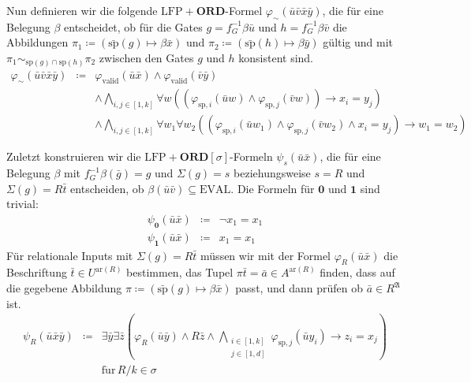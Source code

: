 Nun definieren wir die folgende $\mathrm{LFP}+\mathbf{ORD}$-Formel
$\varphi_{\sim}\left(\bar{u}\bar{v}\bar{x}\bar{y}\right)$, die für
eine Belegung $\beta$ entscheidet, ob für die Gates $g=f_{G}^{-1}\beta\bar{u}$
und $h=f_{G}^{-1}\beta\bar{v}$ die Abbildungen $\pi_{1}\coloneqq\left(\bar{\mathrm{sp}}\left(g\right)\mapsto\beta\bar{x}\right)$
und $\pi_{2}\coloneqq\left(\bar{\mathrm{sp}}\left(h\right)\mapsto\beta\bar{y}\right)$
gültig und mit $\pi_{1}\sim_{\mathrm{sp}\left(g\right)\cap\mathrm{sp}\left(h\right)}\pi_{2}$
zwischen den Gates $g$ und $h$ konsistent sind. 
\begin{eqnarray*}
\varphi_{\sim}\left(\bar{u}\bar{v}\bar{x}\bar{y}\right) & \coloneqq & \varphi_{\mathrm{valid}}\left(\bar{u}\bar{x}\right)\wedge\varphi_{\mathrm{valid}}\left(\bar{v}\bar{y}\right)\\
 &  & \wedge\bigwedge_{i,j\in\left[1,k\right]}\forall w\left(\left(\varphi_{\mathrm{sp},i}\left(\bar{u}w\right)\wedge\varphi_{\mathrm{sp},j}\left(\bar{v}w\right)\right)\rightarrow x_{i}=y_{j}\right)\\
 &  & \wedge\bigwedge_{i,j\in\left[1,k\right]}\forall w_{1}\forall w_{2}\left(\left(\varphi_{\mathrm{sp},i}\left(\bar{u}w_{1}\right)\wedge\varphi_{\mathrm{sp},j}\left(\bar{v}w_{2}\right)\wedge x_{i}=y_{j}\right)\rightarrow w_{1}=w_{2}\right)
\end{eqnarray*}

Zuletzt konstruieren wir die $\mathrm{LFP}+\mathbf{ORD}\left[\sigma\right]$-Formeln
$\psi_{s}\left(\bar{u}\bar{x}\right)$, die für eine Belegung $\beta$
mit $f_{G}^{-1}\beta\left(\bar{g}\right)=g$ und $\Sigma\left(g\right)=s$
beziehungsweise $s=R$ und $\Sigma\left(g\right)=R\bar{t}$ entscheiden,
ob $\beta\left(\bar{u}\bar{v}\right)\subseteq\mathrm{EVAL}$. Die
Formeln für $\mathbf{0}$ und $\mathbf{1}$ sind trivial: 
\begin{eqnarray*}
\psi_{\mathbf{0}}\left(\bar{u}\bar{x}\right) & \coloneqq & \neg x_{1}=x_{1}\\
\psi_{\mathbf{1}}\left(\bar{u}\bar{x}\right) & \coloneqq & x_{1}=x_{1}
\end{eqnarray*}
Für relationale Inputs mit $\Sigma\left(g\right)=R\bar{t}$ müssen
wir mit der Formel $\varphi_{R}\left(\bar{u}\bar{x}\right)$ die Beschriftung
$\bar{t}\in U^{\mathrm{ar}\left(R\right)}$ bestimmen, das Tupel $\pi\bar{t}=\bar{a}\in A^{\mathrm{ar}\left(R\right)}$
finden, dass auf die gegebene Abbildung $\pi\coloneqq\left(\bar{\mathrm{sp}}\left(g\right)\mapsto\beta\bar{x}\right)$
passt, und dann prüfen ob $\bar{a}\in R^{\mathfrak{A}}$ ist. 
\begin{eqnarray*}
\psi_{R}\left(\bar{u}\bar{x}\bar{y}\right) & \coloneqq & \exists\bar{y}\exists\bar{z}\left(\varphi_{R}\left(\bar{u}\bar{y}\right)\wedge R\bar{z}\wedge\bigwedge_{\substack{i\in\left[1,k\right]\\
j\in\left[1,d\right]
}
}\varphi_{\mathrm{sp},j}\left(\bar{u}y_{i}\right)\rightarrow z_{i}=x_{j}\right)\\
 &  & \mathrm{f\ddot{u}r}\,R/k\in\sigma
\end{eqnarray*}

